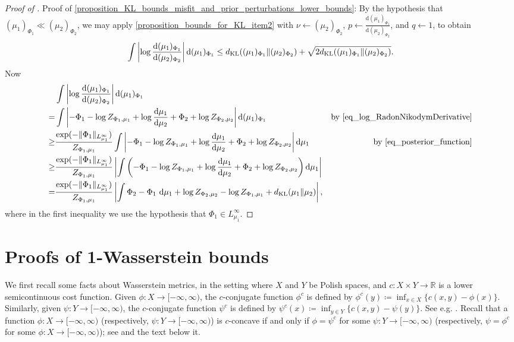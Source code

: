 \documentclass[a4paper]{scrartcl}
\theoremstyle{definition}
\numberwithin{equation}{section}
\newcommand{\R}{\mathbb{R}}
\newcommand{\rd}{\mathrm{d}}
\newcommand{\Abs}[1]{\left\vert#1\right\vert}
\newcommand{\norm}[1]{\Vert #1 \Vert}
\newcommand{\KL}[0]{\textup{KL}}
\begin{document}
\begin{proof}[Proof of ]
Proof of \cref{proposition_KL_bounds_misfit_and_prior_perturbations_lower_bounds}: By the hypothesis that $(\mu_1)_{\Phi_1}\ll(\mu_2)_{\Phi_2}$, we may apply \ref{proposition_bounds_for_KL_item2} with $\nu\leftarrow (\mu_2)_{\Phi_2}$, $p\leftarrow \tfrac{\rd(\mu_1)_{\Phi_1}}{\rd(\mu_2)_{\Phi_2}}$, and $q\leftarrow 1$, to obtain
\begin{equation*}
 \int \Abs{ \log \frac{\rd(\mu_1)_{\Phi_1}}{\rd(\mu_2)_{\Phi_2}}} \rd (\mu_1)_{\Phi_1}\leq d_{\KL}((\mu_1)_{\Phi_1}\Vert (\mu_2)_{\Phi_2})+ \sqrt{2d_{\KL}((\mu_1)_{\Phi_1}\Vert (\mu_2)_{\Phi_2})}.
\end{equation*}
Now
\begin{align*}
 &\int \Abs{ \log \frac{\rd(\mu_1)_{\Phi_1}}{\rd(\mu_2)_{\Phi_2}}} \rd (\mu_1)_{\Phi_1}
 \\
 =&\int \Abs{ -\Phi_1-\log Z_{\Phi_1,\mu_1}+\log\frac{\rd\mu_1}{\rd\mu_2}+\Phi_2+\log Z_{\Phi_2,\mu_2}} \rd (\mu_1)_{\Phi_1} & \text{by \eqref{eq_log_RadonNikodymDerivative}}
 \\
 \geq & \frac{\exp(-\norm{\Phi_1}_{L^\infty_{\mu_1}})}{Z_{\Phi_1,\mu_1}} \int \Abs{ -\Phi_1-\log Z_{\Phi_1,\mu_1}+\log\frac{\rd\mu_1}{\rd\mu_2}+\Phi_2+\log Z_{\Phi_2,\mu_2}} \rd \mu_1 & \text{by \eqref{eq_posterior_function}}
 \\
 \geq & \frac{\exp(-\norm{\Phi_1}_{L^\infty_{\mu_1}})}{Z_{\Phi_1,\mu_1}} \Abs{\int  \left(-\Phi_1-\log Z_{\Phi_1,\mu_1}+\log\frac{\rd\mu_1}{\rd\mu_2}+\Phi_2+\log Z_{\Phi_2,\mu_2}\right) \rd \mu_1} 
 \\
 =&\frac{\exp(-\norm{\Phi_1}_{L^\infty_{\mu_1}})}{Z_{\Phi_1,\mu_1}} \Abs{\int  \Phi_2-\Phi_1~\rd \mu_1+\log Z_{\Phi_2,\mu_2}-\log Z_{\Phi_1,\mu_1} +d_{\KL}(\mu_1\Vert \mu_2)} ,
\end{align*}
where in the first inequality we use the hypothesis that $\Phi_1\in L^\infty_{\mu_1}$.
\end{proof}


\section{Proofs of 1-Wasserstein bounds}
\label{section_W1bounds_proofs}

We first recall some facts about Wasserstein metrics, in the setting where $X$ and $Y$ be Polish spaces, and $c:X\times Y \to \R$ is a lower semicontinuous cost function. 
Given $\phi:X \to [-\infty,\infty)$, the $c$-conjugate function $\phi^c$ is defined by $\phi^c(y)\coloneqq \inf_{x\in X} \{c(x,y)-\phi(x)\}$.
Similarly, given $\psi:Y\to [-\infty,\infty)$, the $c$-conjugate function $\psi^c$ is defined by $\psi^c(x)\coloneqq \inf_{y\in Y}\{c(x,y)-\psi(y)\}$. See e.g. \cite[Definition 3.12]{Ambrosio2021}.
Recall that a function $\phi:X\to [-\infty,\infty)$ (respectively, $\psi:Y\to [-\infty,\infty)$) is $c$-concave if and only if $\phi=\psi^c$ for some $\psi:Y\to [-\infty,\infty)$ (respectively, $\psi=\phi^c$ for some $\phi:X\to [-\infty,\infty)$); see \cite[Definition 3.13]{Ambrosio2021} and the text below it.
\end{document}
